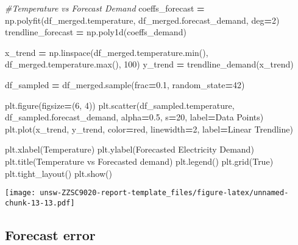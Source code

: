 \documentclass[mstat,12pt,a4paper]{unswthesis}
\newenvironment{Shaded}{\begin{snugshade}}{\end{snugshade}}
\newcommand{\BuiltInTok}[1]{#1}
\newcommand{\CommentTok}[1]{\textcolor[rgb]{0.56,0.35,0.01}{\textit{#1}}}
\newcommand{\DecValTok}[1]{\textcolor[rgb]{0.00,0.00,0.81}{#1}}
\newcommand{\FloatTok}[1]{\textcolor[rgb]{0.00,0.00,0.81}{#1}}
\newcommand{\NormalTok}[1]{#1}
\newcommand{\OperatorTok}[1]{\textcolor[rgb]{0.81,0.36,0.00}{\textbf{#1}}}
\newcommand{\StringTok}[1]{\textcolor[rgb]{0.31,0.60,0.02}{#1}}
\newcommand{\VariableTok}[1]{\textcolor[rgb]{0.00,0.00,0.00}{#1}}
\begin{document}
\begin{Shaded}
\begin{Highlighting}[]
\CommentTok{\#Temperature vs Forecast Demand}
\NormalTok{coeffs\_forecast }\OperatorTok{=}\NormalTok{ np.polyfit(df\_merged.temperature, df\_merged.forecast\_demand, deg}\OperatorTok{=}\DecValTok{2}\NormalTok{)}
\NormalTok{trendline\_forecast }\OperatorTok{=}\NormalTok{ np.poly1d(coeffs\_demand)}

\NormalTok{x\_trend }\OperatorTok{=}\NormalTok{ np.linspace(df\_merged.temperature.}\BuiltInTok{min}\NormalTok{(), df\_merged.temperature.}\BuiltInTok{max}\NormalTok{(), }\DecValTok{100}\NormalTok{)}
\NormalTok{y\_trend }\OperatorTok{=}\NormalTok{ trendline\_demand(x\_trend)}

\NormalTok{df\_sampled }\OperatorTok{=}\NormalTok{ df\_merged.sample(frac}\OperatorTok{=}\FloatTok{0.1}\NormalTok{, random\_state}\OperatorTok{=}\DecValTok{42}\NormalTok{)}

\NormalTok{plt.figure(figsize}\OperatorTok{=}\NormalTok{(}\DecValTok{6}\NormalTok{, }\DecValTok{4}\NormalTok{))}
\NormalTok{plt.scatter(df\_sampled.temperature, df\_sampled.forecast\_demand, alpha}\OperatorTok{=}\FloatTok{0.5}\NormalTok{, s}\OperatorTok{=}\DecValTok{20}\NormalTok{, label}\OperatorTok{=}\StringTok{\textquotesingle{}Data Points\textquotesingle{}}\NormalTok{)}
\NormalTok{plt.plot(x\_trend, y\_trend, color}\OperatorTok{=}\StringTok{\textquotesingle{}red\textquotesingle{}}\NormalTok{, linewidth}\OperatorTok{=}\DecValTok{2}\NormalTok{, label}\OperatorTok{=}\StringTok{\textquotesingle{}Linear Trendline\textquotesingle{}}\NormalTok{)}

\NormalTok{plt.xlabel(}\StringTok{\textquotesingle{}Temperature\textquotesingle{}}\NormalTok{)}
\NormalTok{plt.ylabel(}\StringTok{\textquotesingle{}Forecasted Electricity Demand\textquotesingle{}}\NormalTok{)}
\NormalTok{plt.title(}\StringTok{\textquotesingle{}Temperature vs Forecasted demand\textquotesingle{}}\NormalTok{)}
\NormalTok{plt.legend()}
\NormalTok{plt.grid(}\VariableTok{True}\NormalTok{)}
\NormalTok{plt.tight\_layout()}
\NormalTok{plt.show()}
\end{Highlighting}
\end{Shaded}

\texttt{[image: unsw-ZZSC9020-report-template\_files/figure-latex/unnamed-chunk-13-13.pdf]}

\subsection{Forecast error}\label{forecast-error}
\end{document}
